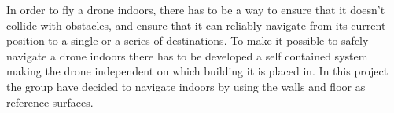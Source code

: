 In order to fly a drone indoors, there has to be a way to ensure that it doesn't collide with obstacles, and ensure that it can reliably navigate from its current position to a single or a series of destinations. 
To make it possible to safely navigate a drone indoors there has to be developed a self contained system making the drone independent on which building it is placed in.
In this project the group have decided to navigate indoors by using the walls and floor as reference surfaces.